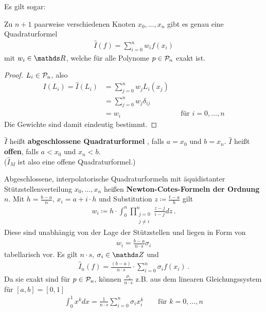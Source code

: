Es gilt sogar:
\begin{Leme}\label{7.2.1}
  Zu $n+1$ paarweise verschiedenen Knoten $x_0,\dots, x_n$
  gibt es genau eine Quadraturformel
  \begin{gather*}
    \hat{I}(f) = \sum_{i=0}^nw_if(x_i)
  \end{gather*}
  mit $w_i\in\R$, welche für alle Polynome $p\in\mathcal{P}_n$ exakt ist.

  \begin{proof}
    $L_i\in\mathcal{P}_n$, also 
    \begin{align*}
      I(L_i)=\hat{I}(L_i)&=\sum_{j=0}^{n}w_jL_i(x_j)\\
                         &=\sum_{j=0}^{n}w_j\delta_{ij}\\
                         &=w_i && \text{für } i=0,\dots,n
    \end{align*}
    Die Gewichte sind damit eindeutig bestimmt.
  \end{proof}
\end{Leme}

\begin{Defe}\label{7.2.2}
  $\hat{I}$ heißt \textbf{abgeschlossene Quadraturformel}
  ,
  falls $a=x_0$ und $b=x_n$.
  $\hat{I}$ heißt \textbf{offen}, falls $a<x_0$ und $x_n<b$.\\
  ($\hat{I}_M$ ist also eine offene Quadraturformel.)
\end{Defe}

Abgeschlossene, interpolatorische Quadraturformeln mit
äquidistanter Stützstellenverteilung $x_0, \dots, x_n$ heißen
\textbf{Newton-Cotes-Formeln der Ordnung $n$}.
Mit $h=\frac{b-a}{n}$, $x_i=a+i\cdot h$ und Substitution
$z\coloneqq \frac{t-a}{h}$ gilt
\begin{gather}
  w_i\coloneqq h
  \cdot \int_0^n \prod_{\substack{j=0\\j\neq i}}^n\frac{z-j}{i-j}dz\, .
  \label{VII.2.3}
\end{gather}
Diese sind unabhängig von der Lage der Stützstellen
und liegen in Form von
\begin{gather*}
  w_i=\frac{b-a}{n\cdot s}\sigma_i
\end{gather*}
tabellarisch vor.  Es gilt $n\cdot s$, $\sigma_i\in\Z$ und
\begin{gather}
  \hat{I}_n(f) = \frac{(b-a)}{n\cdot s}
  \cdot \sum_{i=0}^{n}\sigma_i f(x_i)\,.
  \label{VII.2.4}
\end{gather}
Da sie exakt sind für $p\in \mathcal{P}_n$,
können $\frac{\sigma_i}{n\cdot s}$ z.B. aus dem
linearen Gleichungssystem für $[a,b]=[0,1]$
\begin{gather*}
  \int_0^1x^kdx=\frac{1}{n\cdot s}\sum_{i=0}^{n}\sigma_ix_i^k
  \qquad \text{für } k=0,\dots,n
\end{gather*}

